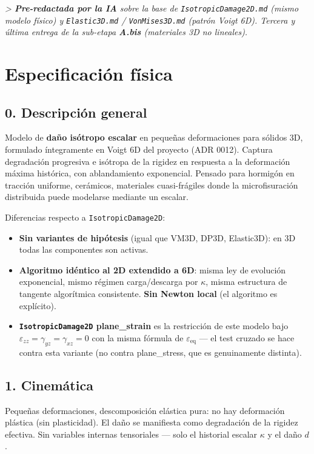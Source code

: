 \documentclass[11pt,letterpaper,oneside]{report}
\begin{document}
\textit{> \textbf{Pre-redactada por la IA} sobre la base de \texttt{IsotropicDamage2D.md} (mismo modelo físico) y \texttt{Elastic3D.md} / \texttt{VonMises3D.md} (patrón Voigt 6D). Tercera y última entrega de la sub-etapa \textbf{A.bis} (materiales 3D no lineales).}



\section{Especificación física}

\subsection{0. Descripción general}

Modelo de \textbf{daño isótropo escalar} en pequeñas deformaciones para sólidos 3D, formulado íntegramente en Voigt 6D del proyecto (ADR 0012). Captura degradación progresiva e isótropa de la rigidez en respuesta a la deformación máxima histórica, con ablandamiento exponencial. Pensado para hormigón en tracción uniforme, cerámicos, materiales cuasi-frágiles donde la microfisuración distribuida puede modelarse mediante un escalar.

Diferencias respecto a \texttt{IsotropicDamage2D}:

\begin{itemize}
  \item \textbf{Sin variantes de hipótesis} (igual que VM3D, DP3D, Elastic3D): en 3D todas las componentes son activas.
  \item \textbf{Algoritmo idéntico al 2D extendido a 6D}: misma ley de evolución exponencial, mismo régimen carga/descarga por $\kappa$, misma estructura de tangente algorítmica consistente. \textbf{Sin Newton local} (el algoritmo es explícito).
  \item \textbf{\texttt{IsotropicDamage2D} plane\_strain} es la restricción de este modelo bajo $\varepsilon_{zz} = \gamma_{yz} = \gamma_{xz} = 0$ con la misma fórmula de $\varepsilon_\text{eq}$ --- el test cruzado se hace contra esta variante (no contra plane\_stress, que es genuinamente distinta).
\end{itemize}

\subsection{1. Cinemática}

Pequeñas deformaciones, descomposición elástica pura: no hay deformación plástica (sin plasticidad). El daño se manifiesta como degradación de la rigidez efectiva. Sin variables internas tensoriales --- solo el historial escalar $\kappa$ y el daño $d$.
\end{document}
